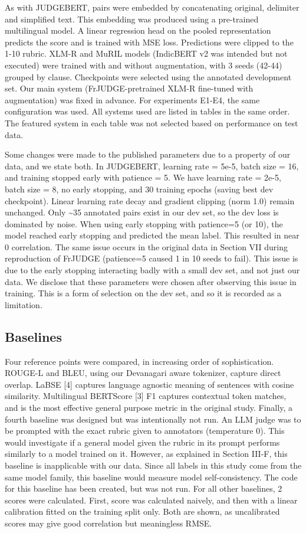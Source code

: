 \documentclass[conference]{IEEEtran}
\begin{document}
As with JUDGEBERT, pairs were embedded by concatenating original, delimiter and simplified text. This embedding was produced using a pre-trained multilingual model. A linear regression head on the pooled representation predicts the score and is trained with MSE loss. Predictions were clipped to the 1-10 rubric. XLM-R and MuRIL models (IndicBERT v2 was intended but not executed) were trained with and without augmentation, with 3 seeds (42-44) grouped by clause. Checkpoints were selected using the annotated development set. Our main system (FrJUDGE-pretrained XLM-R fine-tuned with augmentation) was fixed in advance. For experiments E1-E4, the same configuration was used. All systems used are listed in tables in the same order. The featured system in each table was not selected based on performance on test data.

Some changes were made to the published parameters due to a property of our data, and we state both. In JUDGEBERT, learning rate = 5e-5, batch size = 16, and training stopped early with patience = 5. We have learning rate = 2e-5, batch size = 8, no early stopping, and 30 training epochs (saving best dev checkpoint). Linear learning rate decay and gradient clipping (norm 1.0) remain unchanged. Only \textasciitilde{}35 annotated pairs exist in our dev set, so the dev loss is dominated by noise. When using early stopping with patience=5 (or 10), the model reached early stopping and predicted the mean label. This resulted in near 0 correlation. The same issue occurs in the original data in Section VII during reproduction of FrJUDGE (patience=5 caused 1 in 10 seeds to fail). This issue is due to the early stopping interacting badly with a small dev set, and not just our data. We disclose that these parameters were chosen after observing this issue in training. This is a form of selection on the dev set, and so it is recorded as a limitation.

\subsection{Baselines}

Four reference points were compared, in increasing order of sophistication. ROUGE-L and BLEU, using our Devanagari aware tokenizer, capture direct overlap. LaBSE [4] captures language agnostic meaning of sentences with cosine similarity. Multilingual BERTScore [3] F1 captures contextual token matches, and is the most effective general purpose metric in the original study. Finally, a fourth baseline was designed but was intentionally not run. An LLM judge was to be prompted with the exact rubric given to annotators (temperature 0). This would investigate if a general model given the rubric in its prompt performs similarly to a model trained on it. However, as explained in Section III-F, this baseline is inapplicable with our data. Since all labels in this study come from the same model family, this baseline would measure model self-consistency. The code for this baseline has been created, but was not run. For all other baselines, 2 scores were calculated. First, score was calculated naively, and then with a linear calibration fitted on the training split only. Both are shown, as uncalibrated scores may give good correlation but meaningless RMSE.
\end{document}
